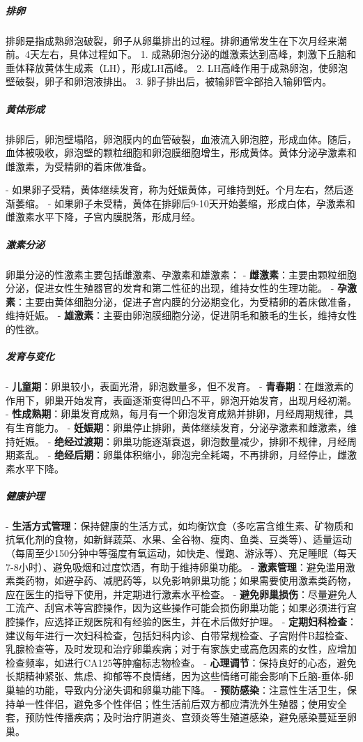 \begin{enumerate}
\subparagraph{排卵}
排卵是指成熟卵泡破裂，卵子从卵巢排出的过程。排卵通常发生在下次月经来潮前。4天左右，具体过程如下。
1. 成熟卵泡分泌的雌激素达到高峰，刺激下丘脑和垂体释放黄体生成素（LH），形成LH高峰。
2. LH高峰作用于成熟卵泡，使卵泡壁破裂，卵子和卵泡液排出。
3. 卵子排出后，被输卵管伞部拾入输卵管内。

\subparagraph{黄体形成}
排卵后，卵泡壁塌陷，卵泡膜内的血管破裂，血液流入卵泡腔，形成血体。随后，血体被吸收，卵泡壁的颗粒细胞和卵泡膜细胞增生，形成黄体。黄体分泌孕激素和雌激素，为受精卵的着床做准备。

- 如果卵子受精，黄体继续发育，称为妊娠黄体，可维持到妊。个月左右，然后逐渐萎缩。
- 如果卵子未受精，黄体在排卵后9-10天开始萎缩，形成白体，孕激素和雌激素水平下降，子宫内膜脱落，形成月经。

\subparagraph{激素分泌}
卵巢分泌的性激素主要包括雌激素、孕激素和雄激素：
- \textbf{雌激素}：主要由颗粒细胞分泌，促进女性生殖器官的发育和第二性征的出现，维持女性的生理功能。
- \textbf{孕激素}：主要由黄体细胞分泌，促进子宫内膜的分泌期变化，为受精卵的着床做准备，维持妊娠。
- \textbf{雄激素}：主要由卵泡膜细胞分泌，促进阴毛和腋毛的生长，维持女性的性欲。

\subparagraph{发育与变化}
- \textbf{儿童期}：卵巢较小，表面光滑，卵泡数量多，但不发育。
- \textbf{青春期}：在雌激素的作用下，卵巢开始发育，表面逐渐变得凹凸不平，卵泡开始发育，出现月经初潮。
- \textbf{性成熟期}：卵巢发育成熟，每月有一个卵泡发育成熟并排卵，月经周期规律，具有生育能力。
- \textbf{妊娠期}：卵巢停止排卵，黄体继续发育，分泌孕激素和雌激素，维持妊娠。
- \textbf{绝经过渡期}：卵巢功能逐渐衰退，卵泡数量减少，排卵不规律，月经周期紊乱。
- \textbf{绝经后期}：卵巢体积缩小，卵泡完全耗竭，不再排卵，月经停止，雌激素水平下降。

\subparagraph{健康护理}
- \textbf{生活方式管理}：保持健康的生活方式，如均衡饮食（多吃富含维生素、矿物质和抗氧化剂的食物，如新鲜蔬菜、水果、全谷物、瘦肉、鱼类、豆类等）、适量运动（每周至少150分钟中等强度有氧运动，如快走、慢跑、游泳等）、充足睡眠（每天7-8小时）、避免吸烟和过度饮酒，有助于维持卵巢功能。
- \textbf{激素管理}：避免滥用激素类药物，如避孕药、减肥药等，以免影响卵巢功能；如果需要使用激素类药物，应在医生的指导下使用，并定期进行激素水平检查。
- \textbf{避免卵巢损伤}：尽量避免人工流产、刮宫术等宫腔操作，因为这些操作可能会损伤卵巢功能；如果必须进行宫腔操作，应选择正规医院和有经验的医生，并在术后做好护理。
- \textbf{定期妇科检查}：建议每年进行一次妇科检查，包括妇科内诊、白带常规检查、子宫附件B超检查、乳腺检查等，及时发现和治疗卵巢疾病；对于有家族史或高危因素的女性，应增加检查频率，如进行CA125等肿瘤标志物检查。
- \textbf{心理调节}：保持良好的心态，避免长期精神紧张、焦虑、抑郁等不良情绪，因为这些情绪可能会影响下丘脑-垂体-卵巢轴的功能，导致内分泌失调和卵巢功能下降。
- \textbf{预防感染}：注意性生活卫生，保持单一性伴侣，避免多个性伴侣；性生活前后双方都应清洗外生殖器；使用安全套，预防性传播疾病；及时治疗阴道炎、宫颈炎等生殖道感染，避免感染蔓延至卵巢。


\end{enumerate}
